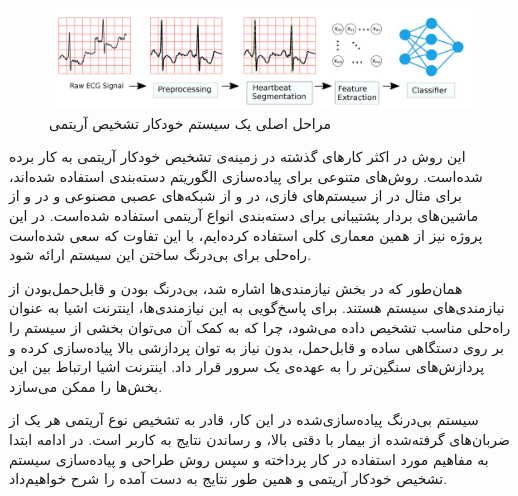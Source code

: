 \begin{figure}[!htb]
\centering
\includegraphics[width=15cm]{Figures/classifier.png}
\caption{مراحل اصلی یک سیستم خودکار تشخیص آریتمی\cite{Mondejar}}
\label{fig:classifierPicture}
\end{figure}
این روش در اکثر کارهای گذشته در زمینه‌ی تشخیص خودکار آریتمی به کار برده شده‌است. روش‌های متنوعی برای پیاده‌سازی الگوریتم دسته‌بندی استفاده شده‌اند، برای مثال در \cite{Exarchos2007} از سیستم‌های فازی، در \cite{deChazal2004} و \cite{Llamedo2011} از شبکه‌‌های عصبی مصنوعی و در \cite{Zhang2005} و \cite{Bazi2013} از ماشین‌های بردار پشتیبانی برای دسته‌بندی انواع آریتمی استفاده شده‌است. در این پروژه نیز از همین معماری کلی استفاده کرده‌ایم، با این تفاوت که سعی شده‌است راه‌حلی برای بی‌درنگ ساختن این سیستم ارائه شود. 

همان‌طور که در بخش نیازمندی‌ها اشاره شد، بی‌درنگ بودن و قابل‌حمل‌بودن از نیازمندی‌های سیستم هستند. برای پاسخ‌گویی به این نیازمندی‌ها، اینترنت اشیا به عنوان راه‌حلی مناسب تشخیص‌ داده می‌شود، چرا که به کمک آن می‌توان بخشی از سیستم را بر روی دستگاهی ساده و قابل‌حمل، بدون نیاز به توان پردازشی بالا پیاده‌سازی کرده و پردازش‌های سنگین‌تر را به عهده‌ی یک سرور قرار داد. اینترنت اشیا ارتباط بین این بخش‌ها را ممکن می‌سازد.

سیستم بی‌درنگ پیاده‌سازی‌شده در این کار،  قادر به تشخیص نوع آریتمی هر یک از ضربان‌های گرفته‌شده از بیمار با دقتی بالا، و رساندن نتایج به کاربر است. در ادامه ابتدا به مفاهیم مورد استفاده در کار پرداخته و سپس روش طراحی و پیاده‌سازی سیستم تشخیص خودکار آریتمی و همین طور نتایج به دست آمده را شرح خواهیم‌داد. 
